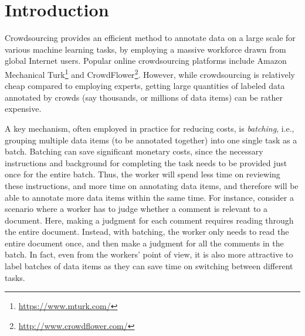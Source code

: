 

\section{Introduction}
\label{sec:intro}

Crowdsourcing provides an efficient method 
to annotate data on a large scale for various machine learning tasks, 
by employing a massive workforce drawn from global Internet users.
Popular online crowdsourcing platforms include
Amazon Mechanical Turk\footnote{\url{https://www.mturk.com/}} and CrowdFlower\footnote{\url{http://www.crowdflower.com/}}.
However, while crowdsourcing is relatively cheap compared
to employing experts, getting large quantities of labeled data
annotated by crowds (say thousands, or millions of data items) 
can be rather expensive. 

A key mechanism, often employed in practice for reducing costs, is {\em batching},
i.e., grouping multiple data items (to be annotated together) into one single
task as a batch. 
Batching can save significant monetary costs, since the necessary instructions
and background for completing the task needs to be provided just once
for the entire batch. 
Thus, the worker will spend less time on reviewing these instructions, 
and more time on annotating data items, and therefore will be able to
annotate more data items within the same time. 
For instance, consider a scenario where a worker has to judge whether
a comment is relevant to a document. 
Here, making a judgment for each comment requires reading through the entire 
document.
Instead, with batching, the worker only needs to read the entire document
once, and then make a judgment for all the comments in the batch. 
In fact, even from the workers' point of view,
it is also more attractive to label batches of data items
as they can save time on switching between different tasks.

